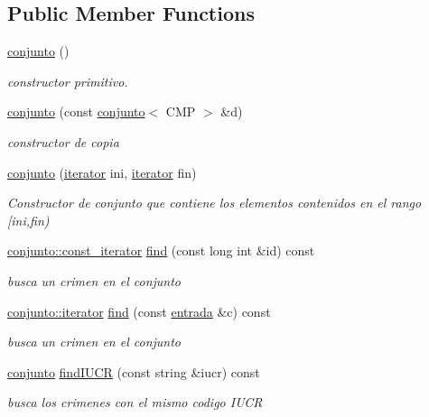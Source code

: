 \subsection*{Public Member Functions}
\begin{DoxyCompactItemize}
\item 
\hyperlink{classconjunto_ab634a250097d154d69a13bf8bde9fec7}{conjunto} ()
\begin{DoxyCompactList}\small\item\em constructor primitivo. \end{DoxyCompactList}\item 
\hyperlink{classconjunto_a40c5625e186cfaf7b05c7001f798a1b8}{conjunto} (const \hyperlink{classconjunto}{conjunto}$<$ C\-M\-P $>$ \&d)
\begin{DoxyCompactList}\small\item\em constructor de copia \end{DoxyCompactList}\item 
\hyperlink{classconjunto_a15f74d8bf6b88f7b7f5c4cc8e8507b19}{conjunto} (\hyperlink{classconjunto_1_1iterator}{iterator} ini, \hyperlink{classconjunto_1_1iterator}{iterator} fin)
\begin{DoxyCompactList}\small\item\em Constructor de conjunto que contiene los elementos contenidos en el rango \mbox{[}ini,fin) \end{DoxyCompactList}\item 
\hyperlink{classconjunto_1_1const__iterator}{conjunto\-::const\-\_\-iterator} \hyperlink{classconjunto_a725ddba7aa25ad0576f13000e035ee6f}{find} (const long int \&id) const 
\begin{DoxyCompactList}\small\item\em busca un crimen en el conjunto \end{DoxyCompactList}\item 
\hyperlink{classconjunto_1_1iterator}{conjunto\-::iterator} \hyperlink{classconjunto_ac69e8200bb0e19785705be34aae32655}{find} (const \hyperlink{classconjunto_a7630ace7cb17bcec07daf5804f1a0780}{entrada} \&c) const 
\begin{DoxyCompactList}\small\item\em busca un crimen en el conjunto \end{DoxyCompactList}\item 
\hyperlink{classconjunto}{conjunto} \hyperlink{classconjunto_a076dc70516af91c07b570bca24c6d9f7}{find\-I\-U\-C\-R} (const string \&iucr) const 
\begin{DoxyCompactList}\small\item\em busca los crimenes con el mismo codigo I\-U\-C\-R \end{DoxyCompactList}\item 

\end{DoxyCompactItemize}
